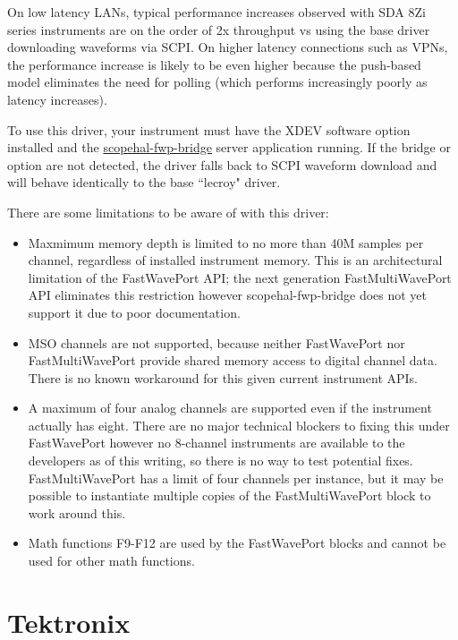 On low latency LANs, typical performance increases observed with SDA 8Zi series instruments are on the order of 2x
throughput vs using the base driver downloading waveforms via SCPI. On higher latency connections such as VPNs, the
performance increase is likely to be even higher because the push-based model eliminates the need for polling (which
performs increasingly poorly as latency increases).

To use this driver, your instrument must have the XDEV software option installed and the
\href{https://github.com/glscopeclient/scopehal-fwp-bridge}{scopehal-fwp-bridge} server application running. If the
bridge or option are not detected, the driver falls back to SCPI waveform download and will behave identically to the
base ``lecroy" driver.

There are some limitations to be aware of with this driver:
\begin{itemize}

\item Maxmimum memory depth is limited to no more than 40M samples per channel, regardless of installed instrument
memory. This is an architectural limitation of the FastWavePort API; the next generation FastMultiWavePort API eliminates
this restriction however scopehal-fwp-bridge does not yet support it due to poor documentation.

\item MSO channels are not supported, because neither FastWavePort nor FastMultiWavePort provide shared memory access to
digital channel data. There is no known workaround for this given current instrument APIs.

\item A maximum of four analog channels are supported even if the instrument actually has eight. There are no major
technical blockers to fixing this under FastWavePort however no 8-channel instruments are available to the developers as
of this writing, so there is no way to test potential fixes. FastMultiWavePort has a limit of four channels per instance,
but it may be possible to instantiate multiple copies of the FastMultiWavePort block to work around this.

\item Math functions F9-F12 are used by the FastWavePort blocks and cannot be used for other math functions.

\end{itemize}

\section{Tektronix}

